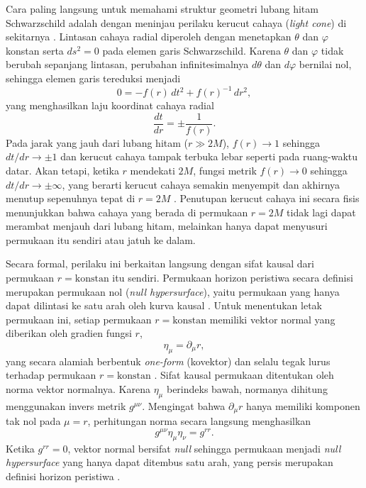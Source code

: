 Cara paling langsung untuk memahami struktur geometri lubang hitam Schwarzschild adalah 
dengan meninjau perilaku kerucut cahaya (\textit{light cone}) di sekitarnya 
\parencite{Carroll2004}. Lintasan cahaya radial diperoleh dengan menetapkan $\theta$ dan 
$\varphi$ konstan serta $ds^2 = 0$ pada elemen garis Schwarzschild. Karena $\theta$ dan 
$\varphi$ tidak berubah sepanjang lintasan, perubahan infinitesimalnya $d\theta$ dan 
$d\varphi$ bernilai nol, sehingga elemen garis tereduksi menjadi
\begin{equation}
    0 = -f(r)\,dt^2 + f(r)^{-1}\,dr^2,
\end{equation}
yang menghasilkan laju koordinat cahaya radial
\begin{equation}
    \frac{dt}{dr} = \pm\frac{1}{f(r)}.
    \label{eq:laju-cahaya-radial}
\end{equation}
Pada jarak yang jauh dari lubang hitam ($r \gg 2M$), $f(r) \to 1$ sehingga $dt/dr \to \pm 1$ 
dan kerucut cahaya tampak terbuka lebar seperti pada ruang-waktu datar. Akan tetapi, ketika 
$r$ mendekati $2M$, fungsi metrik $f(r) \to 0$ sehingga $dt/dr \to \pm\infty$, yang berarti 
kerucut cahaya semakin menyempit dan akhirnya menutup sepenuhnya tepat di $r = 2M$ 
\parencite{Carroll2004}. Penutupan kerucut cahaya ini secara fisis menunjukkan bahwa cahaya 
yang berada di permukaan $r = 2M$ tidak lagi dapat merambat menjauh dari lubang hitam, 
melainkan hanya dapat menyusuri permukaan itu sendiri atau jatuh ke dalam.

Secara formal, perilaku ini berkaitan langsung dengan sifat kausal dari permukaan 
$r = \text{konstan}$ itu sendiri. Permukaan horizon peristiwa secara definisi merupakan 
permukaan nol (\textit{null hypersurface}), yaitu permukaan yang hanya dapat dilintasi ke 
satu arah oleh kurva kausal \parencite{Carroll2004}. Untuk menentukan letak permukaan ini, 
setiap permukaan $r = \text{konstan}$ memiliki vektor normal yang diberikan oleh gradien 
fungsi $r$,
\begin{equation}
    \eta_\mu = \partial_\mu r,
\end{equation}
yang secara alamiah berbentuk \textit{one-form} (kovektor) dan selalu tegak lurus terhadap 
permukaan $r = \text{konstan}$ \parencite{Carroll2004}. Sifat kausal permukaan ditentukan 
oleh norma vektor normalnya. Karena $\eta_\mu$ berindeks bawah, normanya dihitung 
menggunakan invers metrik $g^{\mu\nu}$. Mengingat bahwa $\partial_\mu r$ hanya memiliki 
komponen tak nol pada $\mu = r$, perhitungan norma secara langsung menghasilkan
\begin{equation}
    g^{\mu\nu}\eta_\mu\eta_\nu = g^{rr}.
\end{equation}
Ketika $g^{rr} = 0$, vektor normal bersifat \textit{null} sehingga permukaan menjadi 
\textit{null hypersurface} yang hanya dapat ditembus satu arah, yang persis merupakan 
definisi horizon peristiwa \parencite{Carroll2004}.

